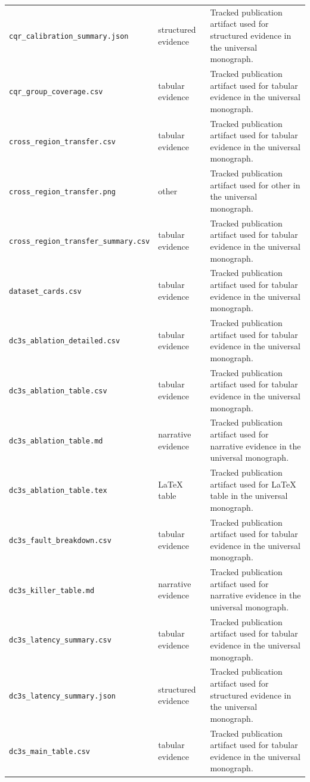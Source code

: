 \begin{longtable}{p{}p{}p{}}
\texttt{cqr\_calibration\_summary.json} & structured evidence & Tracked publication artifact used for structured evidence in the universal monograph.\\
\texttt{cqr\_group\_coverage.csv} & tabular evidence & Tracked publication artifact used for tabular evidence in the universal monograph.\\
\texttt{cross\_region\_transfer.csv} & tabular evidence & Tracked publication artifact used for tabular evidence in the universal monograph.\\
\texttt{cross\_region\_transfer.png} & other & Tracked publication artifact used for other in the universal monograph.\\
\texttt{cross\_region\_transfer\_summary.csv} & tabular evidence & Tracked publication artifact used for tabular evidence in the universal monograph.\\
\texttt{dataset\_cards.csv} & tabular evidence & Tracked publication artifact used for tabular evidence in the universal monograph.\\
\texttt{dc3s\_ablation\_detailed.csv} & tabular evidence & Tracked publication artifact used for tabular evidence in the universal monograph.\\
\texttt{dc3s\_ablation\_table.csv} & tabular evidence & Tracked publication artifact used for tabular evidence in the universal monograph.\\
\texttt{dc3s\_ablation\_table.md} & narrative evidence & Tracked publication artifact used for narrative evidence in the universal monograph.\\
\texttt{dc3s\_ablation\_table.tex} & LaTeX table & Tracked publication artifact used for LaTeX table in the universal monograph.\\
\texttt{dc3s\_fault\_breakdown.csv} & tabular evidence & Tracked publication artifact used for tabular evidence in the universal monograph.\\
\texttt{dc3s\_killer\_table.md} & narrative evidence & Tracked publication artifact used for narrative evidence in the universal monograph.\\
\texttt{dc3s\_latency\_summary.csv} & tabular evidence & Tracked publication artifact used for tabular evidence in the universal monograph.\\
\texttt{dc3s\_latency\_summary.json} & structured evidence & Tracked publication artifact used for structured evidence in the universal monograph.\\
\texttt{dc3s\_main\_table.csv} & tabular evidence & Tracked publication artifact used for tabular evidence in the universal monograph.\\

\end{longtable}
